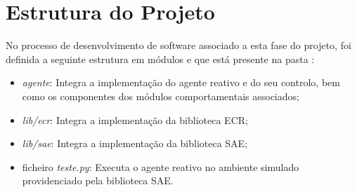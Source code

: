 \section{Estrutura do Projeto}\label{sec:estrutura-projeto}

No processo de desenvolvimento de software associado a esta fase do projeto, foi definida a seguinte estrutura em módulos e que está presente na pasta :

\begin{itemize}
    \item \textit{agente}: Integra a implementação do agente reativo e do seu controlo, bem como os componentes dos módulos comportamentais associados;
    \item \textit{lib/ecr}: Integra a implementação da biblioteca ECR;
    \item \textit{lib/sae}: Integra a implementação da biblioteca SAE;
    \item ficheiro \textit{teste.py}: Executa o agente reativo no ambiente simulado providenciado pela biblioteca SAE.
\end{itemize}
